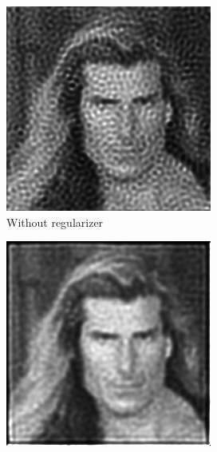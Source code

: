 \documentclass{juliacon}
\begin{document}
\begin{figure}[h]
\begin{subfigure}[b]{.166\textwidth}
                \includegraphics[width=\textwidth]{figures/fabio_deconv_no_reg_iter_30.png}
                \caption{Without regularizer}
                \label{fig:fabiob}
            \end{subfigure}%
            \begin{subfigure}[b]{.166\textwidth}
                \centering
                \includegraphics[width=\textwidth]{figures/fabio_deconv_regularizer_005_iter_30.png}

\end{subfigure}
\end{figure}
\end{document}
